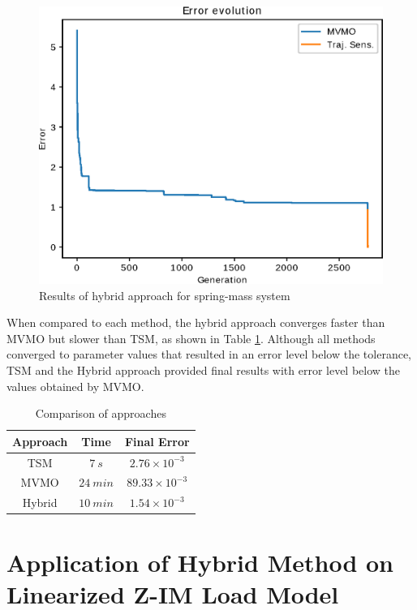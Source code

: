 \begin{figure}[h]
	\caption{Results of hybrid approach for spring-mass system}
	\begin{center}
		\includegraphics[scale=0.7]{Images/Hybrid_conv.eps}
	\end{center}
	\label{fig: Hybrid_conv}
\end{figure}

When compared to each method, the hybrid approach converges faster than MVMO but slower than TSM, as shown in Table \ref{tab: SM}. Although all methods converged to parameter values that resulted in an error level below the tolerance, TSM and the Hybrid approach provided final results with error level below the values obtained by MVMO.

\begin{table}[h]
	\caption{Comparison of approaches}
	\begin{center}
	\begin{tabular}{c|c|c}
		Approach & Time & Final Error \\
		\hline
		TSM  & $7 \ s$  & $2.76\times 10^{-3}$ \\
		MVMO  & $24 \ min$  & $89.33\times 10^{-3}$\\
		Hybrid  & $10 \ min$  & $1.54\times 10^{-3}$
	\end{tabular}
	\end{center}
	\label{tab: SM}
\end{table}

\section{Application of Hybrid Method on Linearized Z-IM Load Model}

